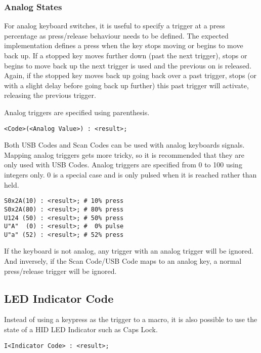 \documentclass{kiibohd-template}
\begin{document}
\subsubsection{Analog States}

For analog keyboard switches, it is useful to specify a trigger at a press percentage as press/release behaviour needs to be defined.
The expected implementation defines a press when the key stops moving or begins to move back up.
If a stopped key moves further down (past the next trigger), stops or begins to move back up the next trigger is used and the previous on is released.
Again, if the stopped key moves back up going back over a past trigger, stops (or with a slight delay before going back up further) this past trigger will activate, releasing the previous trigger.

Analog triggers are specified using parenthesis.

\begin{lstlisting}
<Code>(<Analog Value>) : <result>;
\end{lstlisting}

Both USB Codes and Scan Codes can be used with analog keyboards signals.
Mapping analog triggers gets more tricky, so it is recommended that they are only used with USB Codes.
Analog triggers are specified from 0 to 100 using integers only.
0 is a special case and is only pulsed when it is reached rather than held.

\begin{lstlisting}
S0x2A(10) : <result>; # 10% press
S0x2A(80) : <result>; # 80% press
U124 (50) : <result>; # 50% press
U"A"  (0) : <result>; #  0% pulse
U"a" (52) : <result>; # 52% press
\end{lstlisting}

If the keyboard is not analog, any trigger with an analog trigger will be ignored.
And inversely, if the Scan Code/USB Code maps to an analog key, a normal press/release trigger will be ignored.


\subsection{LED Indicator Code}
\label{subsec:LED_Indicator_Code}

Instead of using a keypress as the trigger to a macro, it is also possible to use the state of a HID LED Indicator such as Caps Lock.

\begin{lstlisting}
I<Indicator Code> : <result>;
\end{lstlisting}
\end{document}
